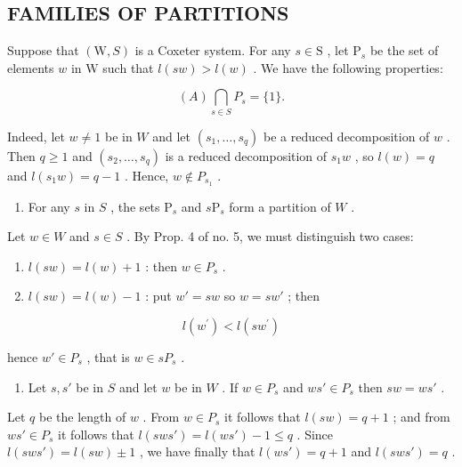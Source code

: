 \subsection{FAMILIES OF PARTITIONS}

Suppose that \((\mathrm{W}, S)\) is a Coxeter system. For any \(s \in \mathrm{S}\) , let \(\mathrm{P}_s\) be the set of elements \(w\) in \(\mathrm{W}\) such that \(l(sw) > l(w)\) . We have the following properties:

\[
(A) \bigcap_ {s \in S} P _ {s} = \{1 \}.
\]

Indeed, let \(w \neq 1\) be in \(W\) and let \((s_1, \ldots, s_q)\) be a reduced decomposition of \(w\) . Then \(q \geqslant 1\) and \((s_2, \ldots, s_q)\) is a reduced decomposition of \(s_1w\) , so \(l(w) = q\) and \(l(s_1w) = q - 1\) . Hence, \(w \notin P_{s_1}\) .

\begin{enumerate}
\def\labelenumi{(\Alph{enumi})}
\setcounter{enumi}{1}
\tightlist
\item
  For any \(s\) in \(S\) , the sets \(\mathrm{P}_s\) and \(s\mathrm{P}_s\) form a partition of \(W\) .
\end{enumerate}

Let \(w \in W\) and \(s \in S\) . By Prop. 4 of no. 5, we must distinguish two cases:

\begin{enumerate}
\def\labelenumi{\alph{enumi})}
\item
  \(l(sw) = l(w) + 1\) : then \(w \in P_s\) .
\item
  \(l(sw) = l(w) - 1\) : put \(w' = sw\) so \(w = sw'\) ; then
\end{enumerate}

\[
l (w ^ {\prime}) <   l (s w ^ {\prime})
\]

hence \(w' \in P_s\) , that is \(w \in sP_s\) .

\begin{enumerate}
\def\labelenumi{(\Alph{enumi})}
\setcounter{enumi}{2}
\tightlist
\item
  Let \(s, s'\) be in \(S\) and let \(w\) be in \(W\) . If \(w \in P_s\) and \(ws' \in P_s\) then \(sw = ws'\) .
\end{enumerate}

Let \(q\) be the length of \(w\) . From \(w \in P_s\) it follows that \(l(sw) = q + 1\) ; and from \(ws' \in P_s\) it follows that \(l(sws') = l(ws') - 1 \leqslant q\) . Since \(l(sws') = l(sw) \pm 1\) , we have finally that \(l(ws') = q + 1\) and \(l(sws') = q\) .

